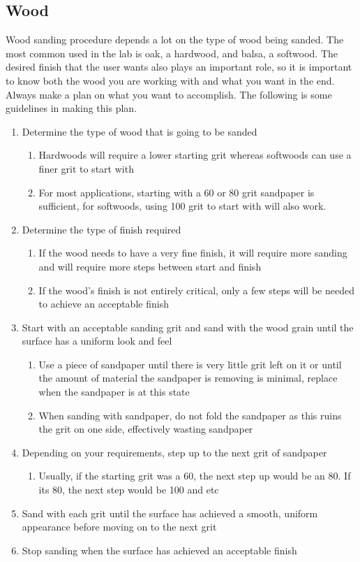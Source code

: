 \subsection{Wood}
Wood sanding procedure depends a lot on the type of wood being sanded. The most common used in the lab is oak, a hardwood, and balsa, a softwood.  The desired finish that the user wants also plays an important role, so it is important to know both the wood you are working with and what you want in the end.  Always make a plan on what you want to accomplish.  The following is some guidelines in making this plan.
\begin{enumerate}
\item Determine the type of wood that is going to be sanded
	\begin{enumerate}
	\item Hardwoods will require a lower starting grit whereas softwoods can use a finer grit to start with
	\item For most applications, starting with a 60 or 80 grit sandpaper is sufficient, for softwoods, using 100 grit to start with will also work.
	\end{enumerate}
\item Determine the type of finish required
	\begin{enumerate}
	\item If the wood needs to have a very fine finish, it will require more sanding and will require more steps between start and finish
	\item If the wood's finish is not entirely critical, only a few steps will be needed to achieve an acceptable finish
	\end{enumerate}
\item Start with an acceptable sanding grit and sand with the wood grain until the surface has a uniform look and feel
	\begin{enumerate}
	\item Use a piece of sandpaper until there is very little grit left on it or until the amount of material the sandpaper is removing is minimal, replace when the sandpaper is at this state
	\item When sanding with sandpaper, do not fold the sandpaper as this ruins the grit on one side, effectively wasting sandpaper
	\end{enumerate}
\item Depending on your requirements, step up to the next grit of sandpaper
	\begin{enumerate}
	\item Usually, if the starting grit was a 60, the next step up would be an 80. If its 80, the next step would be 100 and etc
	\end{enumerate}
\item Sand with each grit until the surface has achieved a smooth, uniform appearance before moving on to the next grit
\item Stop sanding when the surface has achieved an acceptable finish
\end{enumerate}

